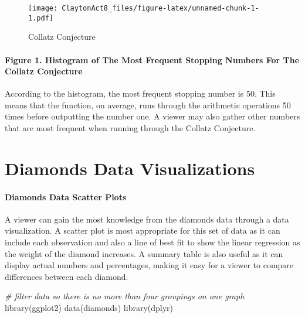 \documentclass[
]{article}
\newenvironment{Shaded}{\begin{snugshade}}{\end{snugshade}}
\newcommand{\CommentTok}[1]{\textcolor[rgb]{0.56,0.35,0.01}{\textit{#1}}}
\newcommand{\FunctionTok}[1]{\textcolor[rgb]{0.00,0.00,0.00}{#1}}
\newcommand{\NormalTok}[1]{#1}
\begin{document}
\begin{figure}
\centering
\texttt{[image: ClaytonAct8\_files/figure-latex/unnamed-chunk-1-1.pdf]}
\caption{Collatz Conjecture}
\end{figure}

\hypertarget{figure-1.-histogram-of-the-most-frequent-stopping-numbers-for-the-collatz-conjecture}{%
\paragraph{Figure 1. Histogram of The Most Frequent Stopping Numbers For
The Collatz
Conjecture}\label{figure-1.-histogram-of-the-most-frequent-stopping-numbers-for-the-collatz-conjecture}}

According to the histogram, the most frequent stopping number is 50.
This means that the function, on average, runs through the arithmetic
operations 50 times before outputting the number one. A viewer may also
gather other numbers that are most frequent when running through the
Collatz Conjecture.

\hypertarget{diamonds-data-visualizations}{%
\section{Diamonds Data
Visualizations}\label{diamonds-data-visualizations}}

\hypertarget{diamonds-data-scatter-plots}{%
\paragraph{Diamonds Data Scatter
Plots}\label{diamonds-data-scatter-plots}}

A viewer can gain the most knowledge from the diamonds data through a
data visualization. A scatter plot is most appropriate for this set of
data as it can include each observation and also a line of best fit to
show the linear regression as the weight of the diamond increases. A
summary table is also useful as it can display actual numbers and
percentages, making it easy for a viewer to compare differences between
each diamond.

\begin{Shaded}
\begin{Highlighting}[]
\CommentTok{\# filter data so there is no more than four groupings on one graph}
\FunctionTok{library}\NormalTok{(ggplot2)}
\FunctionTok{data}\NormalTok{(diamonds)}
\FunctionTok{library}\NormalTok{(dplyr)}
\end{Highlighting}
\end{Shaded}
\end{document}
